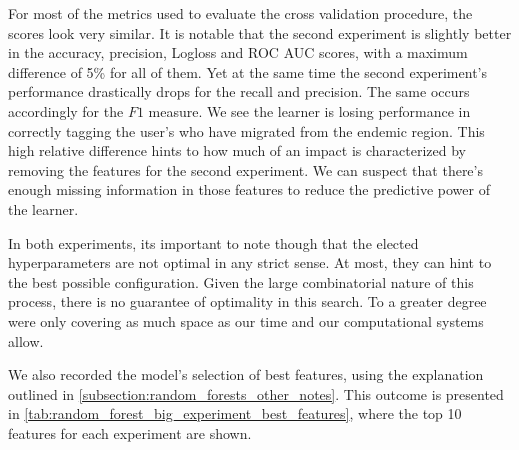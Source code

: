 For most of the metrics used to evaluate the cross validation procedure, the scores look very similar.
It is notable that the second experiment is slightly better in the accuracy, precision, Logloss and ROC AUC scores, with a maximum difference of 5\% for all of them.
Yet at the same time the second experiment's performance drastically drops for the recall and precision.
The same occurs accordingly for the $F1$ measure.
We see the learner is losing performance in correctly tagging the user's who have migrated from the endemic region.
This high relative difference hints to how much of an impact is characterized by removing the features for the second experiment.
We can suspect that there's enough missing information in those features to reduce the predictive power of the learner.

In both experiments, its important to note though that the elected hyperparameters are not optimal in any strict sense.
At most, they can hint to the best possible configuration.
Given the large combinatorial nature of this process, there is no guarantee of optimality in this search.
To a greater degree were only covering as much space as our time and our computational systems allow.


We also recorded the model's selection of best features, using the explanation outlined in \cref{subsection:random_forests_other_notes}.
This outcome is presented in \cref{tab:random_forest_big_experiment_best_features}, where the top 10 features for each experiment are shown.

